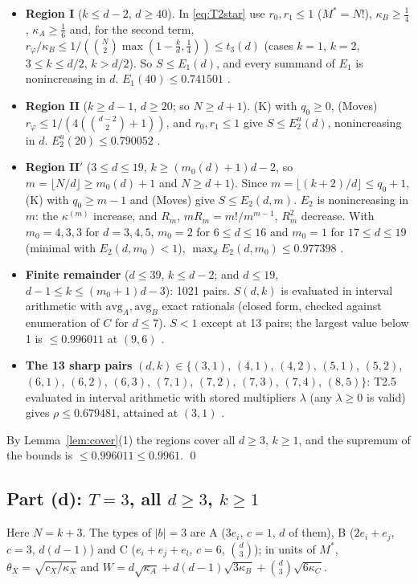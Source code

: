 \documentclass[11pt]{article}
\theoremstyle{definition}
\theoremstyle{remark}
\begin{document}
\begin{itemize}
\item \textbf{Region I} ($k\le d-2$, $d\ge40$). In \eqref{eq:T2star} use $r_0,r_1\le1$ ($M^\ast=N!$), $\kappa_B\ge\frac14$, $\kappa_A\ge\frac16$ and, for the
second term, $r_\varphi/\kappa_B\le1/(\binom N2\max(1-\frac kd,\frac14))\le t_3(d)$ (cases $k=1$, $k=2$, $3\le k\le d/2$, $k>d/2$). So $S\le E_1(d)$, and
every summand of $E_1$ is nonincreasing in $d$. $E_1(40)\le0.741501$ .
\item \textbf{Region II} ($k\ge d-1$, $d\ge20$; so $N\ge d+1$). (K) with $q_0\ge0$, (Moves) $r_\varphi\le1/(4(\binom{d-2}2+1))$, and $r_0,r_1\le1$ give
$S\le E_2^u(d)$, nonincreasing in $d$. $E_2^u(20)\le0.790052$ .
\item \textbf{Region II$'$} ($3\le d\le19$, $k\ge(m_0(d)+1)d-2$, so $m=\lfloor N/d\rfloor\ge m_0(d)+1$ and $N\ge d+1$). Since
$m=\lfloor(k+2)/d\rfloor\le q_0+1$, (K) with $q_0\ge m-1$ and (Moves) give $S\le E_2(d,m)$. $E_2$ is nonincreasing in $m$: the $\kappa^{(m)}$
increase, and $R_m$, $mR_m=m!/m^{m-1}$, $R_m^2$ decrease. With $m_0=4,3,3$ for $d=3,4,5$, $m_0=2$ for $6\le d\le16$ and $m_0=1$ for
$17\le d\le19$ (minimal with $E_2(d,m_0)<1$), $\max_dE_2(d,m_0)\le0.977398$ .
\item \textbf{Finite remainder} ($d\le39$, $k\le d-2$; and $d\le19$, $d-1\le k\le(m_0+1)d-3$): 1021 pairs. $S(d,k)$ is evaluated in interval
arithmetic with $\mathrm{avg}_A,\mathrm{avg}_B$ exact rationals (closed form, checked against enumeration of $C$ for $d\le7$). $S<1$ except at 13 pairs;
the largest value below 1 is $\le0.996011$ at $(9,6)$ .
\item \textbf{The 13 sharp pairs} $(d,k)\in\{(3,1)$, $(4,1)$, $(4,2)$, $(5,1)$, $(5,2)$, $(6,1)$, $(6,2)$, $(6,3)$, $(7,1)$, $(7,2)$, $(7,3)$, $(7,4)$, $(8,5)\}$: T2.5 evaluated in
interval arithmetic with stored multipliers $\lambda$ (any $\lambda\ge0$ is valid) gives $\rho\le0.679481$, attained at $(3,1)$
.
\end{itemize}
By Lemma~\ref{lem:cover}(1) the regions cover all $d\ge3$, $k\ge1$, and the supremum of the bounds is $\le0.996011\le0.9961$. \qed

\subsection{Part (d): \texorpdfstring{$T=3$}{T=3}, all \texorpdfstring{$d\ge3$}{d>=3}, \texorpdfstring{$k\ge1$}{k>=1}}\label{app:T3}
Here $N=k+3$. The types of $|b|=3$ are A ($3e_i$, $c=1$, $d$ of them), B ($2e_i+e_j$, $c=3$, $d(d-1)$) and C ($e_i+e_j+e_l$, $c=6$,
$\binom d3$); in units of $M^\ast$, $\theta_X=\sqrt{c_X/\kappa_X}$ and $W=d\sqrt{\kappa_A}+d(d-1)\sqrt{3\kappa_B}+\binom d3\sqrt{6\kappa_C}$.
\end{document}
